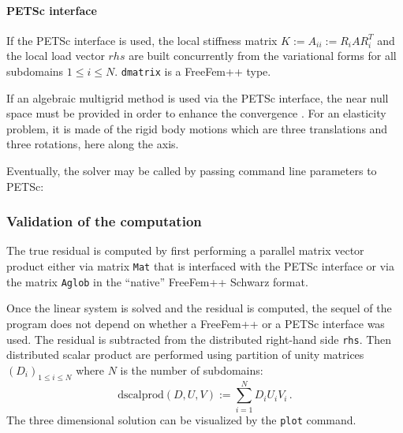 

\paragraph{PETSc interface} %
\label{par:_tt_petsc_interface}

If the PETSc interface is used, the local stiffness matrix $K := A_{ii} := R_i A R_i^T$ and the local load vector $rhs$ are built concurrently from the variational forms for all subdomains $1\le i\le N$.
\texttt{dmatrix} is a FreeFem++ type.

If an algebraic multigrid method is used via the PETSc interface, the near null space must be provided in order to enhance the convergence
. For an elasticity problem, it is made of the rigid body motions which are three translations and three rotations, here along the axis. 

Eventually, the solver may be called by passing command line parameters to PETSc:




\subsubsection{Validation of the computation} %
\label{sub:validation_of_the_computation}
The true residual is computed by first performing a parallel matrix vector product either via matrix {\tt Mat} that is interfaced with the PETSc interface
or via the matrix {\tt Aglob} in the ``native'' FreeFem++ Schwarz format.


Once the linear system is solved and the residual is computed, the sequel of the program does not depend on whether a FreeFem++ or a PETSc interface was used. 
The residual is subtracted from the distributed right-hand side {\tt rhs}. Then distributed scalar product are performed using  partition of unity matrices $(D_i)_{1\le i \le N}$ where $N$ is the number of subdomains:
\[
\text{dscalprod}(D,U,V) := \sum_{i=1}^N D_i U_i V_i\,.
\]
The three dimensional solution can be visualized by the {\tt plot} command. 








